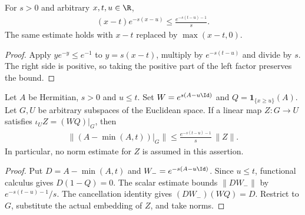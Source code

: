 \begin{theorem}
    \label{thm:linear_exponential_weight}
    \leanok
    For $s>0$ and arbitrary $x,t,u\in\R$,
    \begin{align}
        (x-t)e^{-s(x-u)}\le\frac{e^{-s(t-u)-1}}s.
        \label{eq:linear_exponential_weight}
    \end{align}
    The same estimate holds with $x-t$ replaced by $\max(x-t,0)$.
\end{theorem}
\begin{proof}
    \leanok
    Apply $ye^{-y}\le e^{-1}$ to $y=s(x-t)$, multiply by
    $e^{-s(t-u)}$ and divide by $s$. The right side is positive, so taking
    the positive part of the left factor preserves the bound.
\end{proof}

\begin{theorem}
    \label{thm:excess_actual_weighted_restriction}
    \leanok
    Let $A$ be Hermitian, $s>0$ and $u\le t$. Set
    $W=e^{s(A-u\Id)}$ and $Q=\mathbf1_{\{x\ge u\}}(A)$.
    Let $G,U$ be arbitrary subspaces of the Euclidean space. If a linear
    map $Z:G\to U$ satisfies $\iota_UZ=(WQ)|_G$, then
    \begin{align}
        \|(A-\min(A,t))|_G\|
        \le\frac{e^{-s(t-u)-1}}s\,\|Z\|.
        \label{eq:excess_weighted_restriction}
    \end{align}
    In particular, no norm estimate for $Z$ is assumed in this assertion.
\end{theorem}
\begin{proof}
    \leanok
    Put $D=A-\min(A,t)$ and $W_-=e^{-s(A-u\Id)}$.
    Since $u\le t$, functional calculus gives $D(1-Q)=0$.
    The scalar estimate bounds $\|DW_-\|$ by $e^{-s(t-u)-1}/s$.
    The cancellation identity gives $(DW_-)(WQ)=D$.
    Restrict to $G$, substitute the actual embedding of $Z$, and take norms.
\end{proof}
